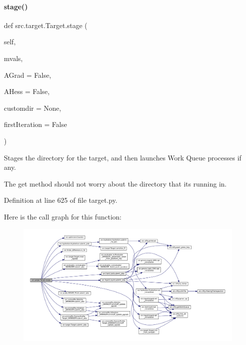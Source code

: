 \paragraph{\texorpdfstring{stage()}{stage()}}
{\footnotesize\ttfamily def src.\+target.\+Target.\+stage (\begin{DoxyParamCaption}\item[{}]{self,  }\item[{}]{mvals,  }\item[{}]{A\+Grad = {\ttfamily False},  }\item[{}]{A\+Hess = {\ttfamily False},  }\item[{}]{customdir = {\ttfamily None},  }\item[{}]{first\+Iteration = {\ttfamily False} }\end{DoxyParamCaption})}



Stages the directory for the target, and then launches Work Queue processes if any. 

The \textquotesingle{}get\textquotesingle{} method should not worry about the directory that it\textquotesingle{}s running in. 

Definition at line 625 of file target.\+py.

Here is the call graph for this function\+:
\nopagebreak
\begin{figure}[H]
\begin{center}
\leavevmode
\includegraphics[width=350pt]{classsrc_1_1target_1_1Target_af543ca7235b5112aa29018ffa7bc1e1c_cgraph}
\end{center}
\end{figure}
\mbox{\label{classsrc_1_1target_1_1Target_a4a2cfc8acc2431063572174a99494215}} 
